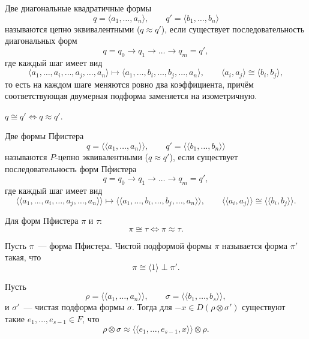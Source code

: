 \documentclass[12pt]{article}
\begin{document}
	\begin{definition}
		Две диагональные квадратичные формы
		\[
		q = \langle a_1, \ldots, a_n \rangle, \qquad q' = \langle b_1, \ldots, b_n \rangle
		\]
		называются цепно эквивалентными ($q \approx q'$), если существует последовательность диагональных форм
		\[
		q = q_0 \to q_1 \to \ldots \to q_m = q',
		\]
		где каждый шаг имеет вид
		\[
		\langle a_1, \ldots, a_i, \ldots, a_j, \ldots, a_n \rangle \longmapsto \langle a_1, \ldots, b_i, \ldots, b_j, \ldots, a_n \rangle, \qquad \langle a_i, a_j \rangle \cong \langle b_i, b_j \rangle,
		\]
		то есть на каждом шаге меняются ровно два коэффициента, причём соответствующая двумерная подформа заменяется на изометричную.
	\end{definition}
	
	\begin{theorem}
		$q \cong q' \Leftrightarrow q \approx q'$.
	\end{theorem}
	
	\begin{definition}
		Две формы Пфистера
		\[
		q = \langle\langle a_1, \ldots, a_n \rangle\rangle, \qquad q' = \langle\langle b_1, \ldots, b_n \rangle\rangle
		\]
		называются $P$-цепно эквивалентными ($q \approx q'$), если существует последовательность форм Пфистера
		\[
		q = q_0 \to q_1 \to \ldots \to q_m = q',
		\]
		где каждый шаг имеет вид
		\[
		\langle\langle a_1, \ldots, a_i, \ldots, a_j, \ldots, a_n \rangle\rangle \longmapsto \langle\langle a_1, \ldots, b_i, \ldots, b_j, \ldots, a_n \rangle\rangle, \qquad \langle\langle a_i, a_j \rangle\rangle \cong \langle\langle b_i, b_j \rangle\rangle.
		\]
	\end{definition}
	
	\begin{theorem}
		Для форм Пфистера $\pi$ и $\tau$:
		\[
		\pi \cong \tau \Leftrightarrow \pi \approx \tau.
		\]
	\end{theorem}
	
	\begin{definition}
		Пусть $\pi$~--- форма Пфистера. Чистой подформой формы $\pi$ называется форма $\pi'$ такая, что
		\[
		\pi \cong \langle 1 \rangle \perp \pi'.
		\]
	\end{definition}
	
	\begin{lemma}
		Пусть
		\[
		\rho = \langle\langle a_1, \ldots, a_n \rangle\rangle, \qquad \sigma = \langle\langle b_1, \ldots, b_s \rangle\rangle,
		\]
		и $\sigma'$~--- чистая подформа формы $\sigma$. Тогда для $-x \in D(\rho \otimes \sigma')$ существуют такие $e_1, \ldots, e_{s-1} \in F$, что
		\[
		\rho \otimes \sigma \approx \langle\langle e_1, \ldots, e_{s-1}, x \rangle\rangle \otimes \rho.
		\]
	\end{lemma}
	
\end{document}
